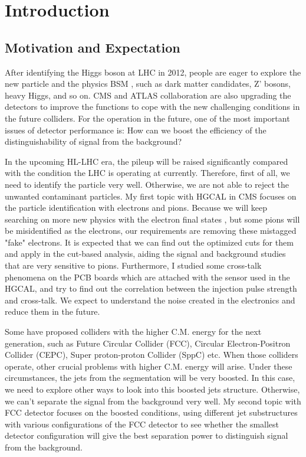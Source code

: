 \documentclass[12pt,twoside,a4paper,an,final]{cms-tdr}
\begin{document}
\section{Introduction}
\subsection{Motivation and Expectation}
After identifying the Higgs boson at LHC in 2012, people are eager to explore the new particle and the physics BSM , such as dark matter candidates, Z' bosons, heavy Higgs, and so on. CMS and ATLAS collaboration are also upgrading the detectors to improve the functions to cope with the new challenging conditions in the future colliders. For the operation in the future, one of the most important issues of detector performance is: How can we boost the efficiency of the distinguishability of signal from the background?

In the upcoming HL-LHC era, the pileup will be raised significantly compared with the condition the LHC is operating at currently. Therefore, first of all, we need to identify the particle very well. Otherwise, we are not able to reject the unwanted contaminant particles. My first topic with HGCAL in CMS focuses on the particle identification with electrons and pions. Because we will keep searching on more new physics with the electron final states , but some pions will be misidentified as the electrons, our requirements are removing these mistagged "fake" electrons. It is expected that we can find out the optimized cuts for them and apply in the cut-based analysis, aiding the signal and background studies that are very sensitive to pions. Furthermore, I studied some cross-talk phenomena on the PCB boards which are attached with the sensor used in the HGCAL, and try to find out the correlation between the injection pulse strength and cross-talk. We expect to understand the noise created in the electronics and reduce them in the future.

Some have proposed colliders with the higher C.M. energy for the next generation, such as Future Circular Collider (FCC), Circular Electron-Positron Collider (CEPC), Super proton-proton Collider (SppC) etc. When those colliders operate, other crucial problems with higher C.M. energy will arise. Under these circumstances, the jets from the segmentation will be very boosted. In this case, we need to explore other ways to look into this boosted jets structure. Otherwise, we can't separate the signal from the background very well. My second topic with FCC detector focuses on the boosted conditions, using different jet substructures with various configurations of the FCC detector to see whether the smallest detector configuration will give the best separation power to distinguish signal from the background.
\end{document}

